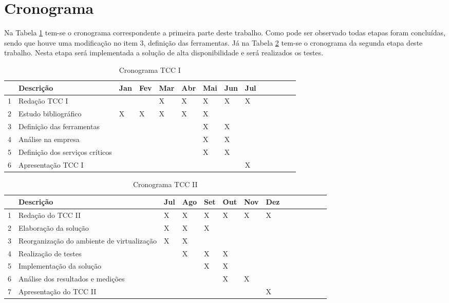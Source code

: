 \newpage
\section{Cronograma}
\label{section:cronograma}

Na Tabela \ref{tab:propcronograma} tem-se o cronograma correspondente a primeira parte deste trabalho. Como pode ser observado todas etapas foram
concluídas, sendo que houve uma modificação no item 3, definição das ferramentas.
Já na Tabela \ref{tab:implcronograma} tem-se o cronograma da segunda etapa deste trabalho. Nesta etapa será implementada a solução de 
alta disponibilidade e será realizados os testes.

\begin{table}[h!]\normalsize %
\caption {Cronograma TCC I}
\label{tab:propcronograma}
\begin{center}
\def\arraystretch{1}
\setlength{\tabcolsep}{0.15cm}
\begin{tabular}{|l|l|l|l|l|l|l|l|l|l|l|l|l|l|}\hline
 & \textbf{Descrição} & \textbf{Jan} & \textbf{Fev} & \textbf{Mar} & \textbf{Abr} & \textbf{Mai} & \textbf{Jun} & \textbf{Jul} \\\hline
1 & Redação TCC I & & & X & X & X & X & X \\\hline
2 & Estudo bibliográfico & X & X & X & X & X & & \\\hline
3 & Definição das ferramentas & & & & & X & X & \\\hline
4 & Análise na empresa & & & & & X & X & \\\hline
5 & Definição dos serviços críticos & & & & & X & X & \\\hline
6 & Apresentação TCC I & & & & & & & X \\\hline
\end{tabular}
\end{center}
\end{table}

\begin{table}[h!]\normalsize %
\caption {Cronograma TCC II}
\label{tab:implcronograma}
\begin{center}
\def\arraystretch{1}
\setlength{\tabcolsep}{0.15cm}
\begin{tabular}{|l|l|l|l|l|l|l|l|l|l|l|l|l|l|}\hline
 & \textbf{Descrição} & \textbf{Jul} & \textbf{Ago} & \textbf{Set} & \textbf{Out} & \textbf{Nov} & \textbf{Dez} \\\hline
1 & Redação do TCC II & X & X & X & X & X & X \\\hline
2 & Elaboração da solução & X & X & X & & & \\\hline
3 & Reorganização do ambiente de virtualização & X & X & & & & \\\hline
4 & Realização de testes & & X & X & X & & \\\hline
5 & Implementação da solução & & & X & X & & \\\hline
6 & Análise dos resultados e medições & & & & X & X & \\\hline
7 & Apresentação do TCC II & & & & & & X \\\hline
\end{tabular}
\end{center}
\end{table}
